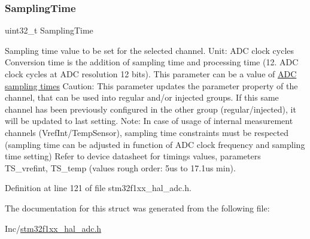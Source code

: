 \subsubsection{\texorpdfstring{Sampling\+Time}{SamplingTime}}
{\footnotesize\ttfamily uint32\+\_\+t Sampling\+Time}

Sampling time value to be set for the selected channel. Unit\+: A\+DC clock cycles Conversion time is the addition of sampling time and processing time (12. A\+DC clock cycles at A\+DC resolution 12 bits). This parameter can be a value of \hyperlink{group___a_d_c__sampling__times}{A\+DC sampling times} Caution\+: This parameter updates the parameter property of the channel, that can be used into regular and/or injected groups. If this same channel has been previously configured in the other group (regular/injected), it will be updated to last setting. Note\+: In case of usage of internal measurement channels (Vref\+Int/\+Temp\+Sensor), sampling time constraints must be respected (sampling time can be adjusted in function of A\+DC clock frequency and sampling time setting) Refer to device datasheet for timings values, parameters T\+S\+\_\+vrefint, T\+S\+\_\+temp (values rough order\+: 5us to 17.\+1us min). 

Definition at line 121 of file stm32f1xx\+\_\+hal\+\_\+adc.\+h.



The documentation for this struct was generated from the following file\+:\begin{DoxyCompactItemize}
\item 
Inc/\hyperlink{stm32f1xx__hal__adc_8h}{stm32f1xx\+\_\+hal\+\_\+adc.\+h}\end{DoxyCompactItemize}
